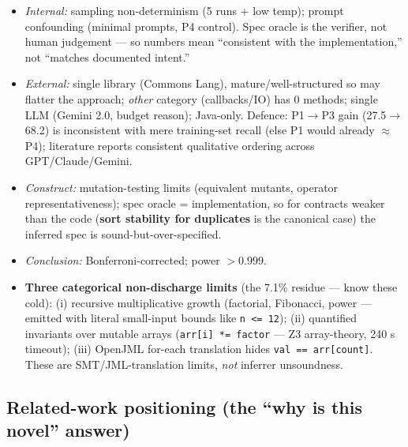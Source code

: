 \documentclass[11pt]{article}
\begin{document}
\begin{itemize}[leftmargin=1.4em,itemsep=0.05em]
  \item \emph{Internal:} sampling non-determinism (5 runs + low temp); prompt
        confounding (minimal prompts, P4 control). Spec oracle is the verifier,
        not human judgement --- so numbers mean ``consistent with the
        implementation,'' not ``matches documented intent.''
  \item \emph{External:} single library (Commons Lang), mature/well-structured
        so may flatter the approach; \emph{other} category (callbacks/IO) has 0
        methods; single LLM (Gemini 2.0, budget reason); Java-only. Defence:
        P1$\to$P3 gain (27.5$\to$68.2) is inconsistent with mere training-set
        recall (else P1 would already $\approx$ P4); literature reports
        consistent qualitative ordering across GPT/Claude/Gemini.
  \item \emph{Construct:} mutation-testing limits (equivalent mutants, operator
        representativeness); spec oracle = implementation, so for contracts
        weaker than the code (\textbf{sort stability for duplicates} is the
        canonical case) the inferred spec is sound-but-over-specified.
  \item \emph{Conclusion:} Bonferroni-corrected; power $>0.999$.
  \item \textbf{Three categorical non-discharge limits} (the 7.1\% residue ---
        know these cold): (i) recursive multiplicative growth (factorial,
        Fibonacci, power --- emitted with literal small-input bounds like
        \texttt{n <= 12}); (ii) quantified invariants over mutable arrays
        (\texttt{arr[i] *= factor} --- Z3 array-theory, 240 s timeout);
        (iii) OpenJML for-each translation hides \texttt{val == arr[count]}.
        These are SMT/JML-translation limits, \emph{not} inferrer unsoundness.
\end{itemize}

\subsection{Related-work positioning (the ``why is this novel'' answer)}
\end{document}
